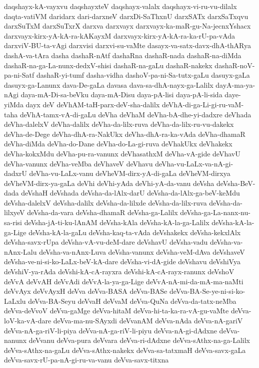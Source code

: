{daqshayx-kA-vayxvu
daqshayxteV
daqshayx-valalx
daqshayx-vi-ru-vu-dilalx
daqta-vatiVM
daridarx
dari-darxneV
darxDi-SaThxnU
darxSATx
darxSaTxqvu
darxSuTxM
darxSuTxrX
darxva
darxvayx
darxvayx-ka-maR-gu-Na-jecnxYshacx
darxvayx-kirx-yA-kA-ra-kAKayxM
darxvayx-kirx-yA-kA-ra-ka-rU-pa-vAda
darxviV-BU-ta-vAgi
darxvisi
darxvi-su-vaMte
dasayx-va-satx-davx-dhA-thARya
dashA-va-tAra
dasha
dashaR-nAtf
dashaRna
dashaR-nada
dashaR-na-diMda
dashaR-na-ga-La-nunx-dedxV-shisi
dashaR-na-gaLu
dashaR-nakekx
dashaR-noV-pa-ni-Satf
dashaR-yi-tumf
dasha-vidha
dashoV-pa-ni-Sa-tutx-gaLu
dasuyx-gaLa
dasuyx-ga-Lanunx
dava-De-gaLa
davasa
dava-sa-dhA-nayx-ga-Lalilx
dayA-ma-ya-nAgi
daya-mA-Di-sa-beVku
daya-mA-Disu
daya-pA-lisi
daya-pA-li-sida
daye-yiMda
dayx
deV
deVhAM-taH-parx-deV-sha-dalilx
deVhA-di-ga-Li-gi-ru-vaM-taha
deVhA-tamx-vA-di-gaLu
deVha
deVhaM
deVha-bA-dhe-yi-dadxre
deVhada
deVha-dalelxV
deVha-dalilx
deVha-da-lilx-ruva
deVha-da-lilx-ru-vu-dakekx
deVha-de-Dege
deVha-dhA-ra-NakUkx
deVha-dhA-ra-ka-vAda
deVha-dhamaR
deVha-diMda
deVha-do-Dane
deVha-do-La-gi-ruva
deVhakUkx
deVhakekx
deVha-kokxMdu
deVha-pu-ra-vanunx
deVhasathxM
deVha-vA-gide
deVhavU
deVha-vanunx
deVha-veMba
deVhaveV
deVhavu
deVha-vu-LaLx-va-nA-gi-dadxrU
deVha-vu-LaLx-vanu
deVheVM-dirx-yA-di-gaLa
deVheVM-dirxya
deVheVM-dirx-ya-gaLa
deVhi
deVhi-yAda
deVhi-yA-da-vanu
deVsha
deVsha-BeV-dada
deVshaH
deVshada
deVsha-da-lAlx-darU
deVsha-da-lAlx-ga-beV-keMdu
deVsha-dalelxV
deVsha-dalilx
deVsha-da-lilxde
deVsha-da-lilx-ruva
deVsha-da-lilxyeV
deVsha-da-vara
deVsha-dhamaR
deVsha-ga-Lalilx
deVsha-ga-La-nanx-nu-sa-risi
deVsha-jA-ti-ku-lAnAM
deVsha-kAla
deVsha-kA-la-ga-Lalilx
deVsha-kA-la-ga-Lige
deVsha-kA-la-gaLu
deVsha-kaq-ta-vAda
deVshakekx
deVsha-kekxlAlx
deVsha-savx-rUpa
deVsha-vA-vu-deM-dare
deVshavU
deVsha-vadu
deVsha-va-nAnx-Lalu
deVsha-va-nAnx-Luva
deVsha-vanunx
deVsha-veM-dAva
deVshaveV
deVsha-ve-ni-si-ko-LaLx-beV-kA-dare
deVsha-vi-dA-gide
deVshavu
deVshiVya
deVshiV-ya-rAda
deVshi-kA-cA-rayxra
deVshi-kA-cA-rayx-ranunx
deVshoV
deVvA
deVvAH
deVvAdi
deVvA-la-ya-ga-Lige
deVvA-nA-mi-da-mA-ma-naMti
deVvAyx
deVvAyxH
deVva
deVva-BASA
deVva-BASe
deVva-BA-Se-ye-ni-si-ko-LaLxlu
deVva-BA-Seyu
deVvaH
deVvaM
deVva-QuNa
deVva-da-tatx-neMba
deVva-deVvoV
deVva-gaMge
deVva-hitaM
deVva-hi-ta-ka-ra-vA-gu-vaMte
deVva-loV-ka-vA-dare
deVva-ma-nu-SAyxdi
deVvanAM
deVva-nAda
deVva-nA-gariV
deVva-nA-ga-riV-li-piya
deVva-nA-ga-riV-li-piyu
deVva-nA-gi-dAdxne
deVva-nanunx
deVvanu
deVva-pura
deVvara
deVva-ri-dAdxne
deVva-sAthx-na-ga-Lalilx
deVva-sAthx-na-gaLu
deVva-sAthx-nakekx
deVva-sa-tatxmaH
deVva-savx-gaLa
deVva-savx-rU-pa-nA-gi-ru-va-vanu
deVva-savx-titxna
}
